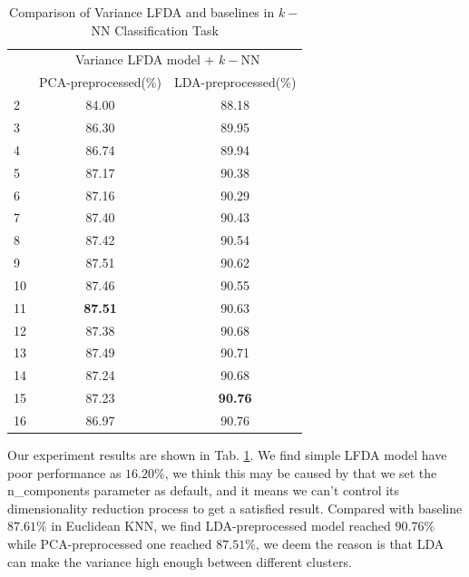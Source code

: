 \documentclass[conference]{IEEEtran}
\begin{document}
\begin{table}[htbp]
	\centering
 	\newcommand{\tabincell}[2]{\begin{tabular}{@{}#1@{}}#2\end{tabular}}
 	\renewcommand\arraystretch{1.0}
 	\caption{Comparison of Variance LFDA and baselines in $k-$NN Classification Task}
 	\label{base3}%
 		\begin{tabular}{@{}p{1cm}<{\centering}|c|c}
 		\hline
 		\multirow{2}{*}{\diagbox[height=2\line,width=1.42cm,font=\tiny]{$k$}{Acc.}{$\mathit{M}$}} &
 		\multicolumn{2}{c}{Variance LFDA model + $k-$NN}\\
 		\cline{2-3}
 		& {PCA-preprocessed(\%)} & {LDA-preprocessed(\%)}\\
 		\hline
 		2   & 84.00 & 88.18\\
 		\hline
 		3   & 86.30 & 89.95\\
 		\hline
 		4   & 86.74 & 89.94\\
 		\hline
 		5   & 87.17 & 90.38\\
 		\hline
 		6   & 87.16 & 90.29\\
 		\hline
 		7   & 87.40 & 90.43\\
 		\hline
 		8   & 87.42 & 90.54\\
 		\hline
 		9   & 87.51 & 90.62\\
 		\hline
 		10   & 87.46 & 90.55\\
 		\hline
 		11   & \textbf{87.51} & 90.63\\
 		\hline
 		12   & 87.38 & 90.68\\
 		\hline
 		13   & 87.49 & 90.71\\
 		\hline
 		14   & 87.24 & 90.68\\
 		\hline
 		15   & 87.23 & \textbf{90.76}\\
 		\hline
 		16   & 86.97 & 90.76\\
 		\hline
 	\end{tabular}
\end{table}

Our experiment results are shown in Tab. \ref{base3}. We find simple LFDA model have poor performance as $16.20\%$, we think this may be caused by that we set the n\_components parameter as default, and it means we can't control its dimensionality reduction process to get a satisfied result. Compared with baseline $87.61\%$ in Euclidean KNN, we find LDA-preprocessed model reached $90.76\%$ while PCA-preprocessed one reached $87.51\%$, we deem the reason is that LDA can make the variance high enough between different clusters.
\end{document}
